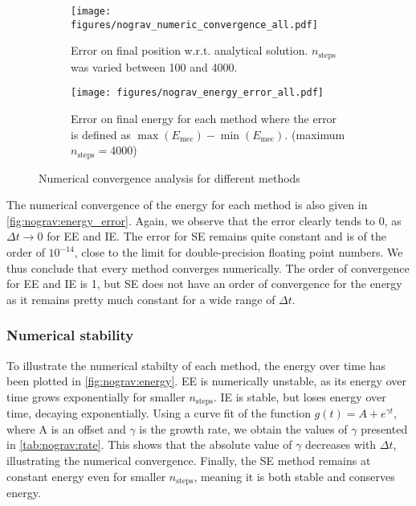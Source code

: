 \begin{figure}[h]
    \centering
    \begin{subfigure}{0.45\linewidth}
        \centering
        \texttt{[image: figures/nograv\_numeric\_convergence\_all.pdf]}
        \caption{Error on final position w.r.t. analytical solution. $n_\textrm{steps}$ was varied between 100 and 4000.}
        \label{fig:nograv:convergence}
    \end{subfigure}
    \hspace*{0.2cm}
    \begin{subfigure}{0.45\linewidth}
        \centering
        \texttt{[image: figures/nograv\_energy\_error\_all.pdf]}
        \caption{Error on final energy for each method where the error is defined as $\max(E_\textrm{mec}) - \min(E_\textrm{mec}).$ (maximum $n_\textrm{steps}=4000$)}
        \label{fig:nograv:energy_error}
    \end{subfigure}
    \caption{Numerical convergence analysis for different methods}
\end{figure}

The numerical convergence of the energy for each method is also given in \autoref{fig:nograv:energy_error}. Again, we observe that the error clearly tends to 0, as $\Delta t \rightarrow 0$ for EE and IE. The error for SE remains quite constant and is of the order of $10^{-14}$, close to the limit for double-precision floating point numbers. We thus conclude that every method converges numerically. The order of convergence for EE and IE is 1, but SE does not have an order of convergence for the energy as it remains pretty much constant for a wide range of $\Delta t$.

\subsubsection{Numerical stability}

To illustrate the numerical stabilty of each method, the energy over time has been plotted in \autoref{fig:nograv:energy}. EE is numerically unstable, as its energy over time grows exponentially for smaller $n_\textrm{steps}$. IE is stable, but loses energy over time, decaying exponentially. Using a curve fit of the function $g(t) = A + e^{\gamma t}$, where A is an offset and $\gamma$ is the growth rate, we obtain the values of $\gamma$ presented in \autoref{tab:nograv:rate}. This shows that the absolute value of $\gamma$ decreases with $\Delta t$, illustrating the numerical convergence. Finally, the SE method remains at constant energy even for smaller $n_\textrm{steps}$, meaning it is both stable and conserves energy.

